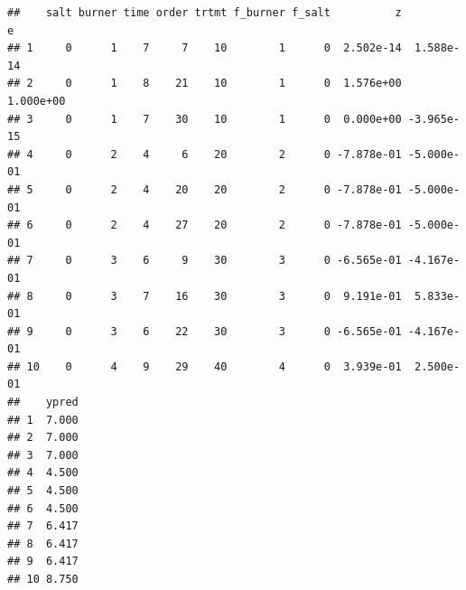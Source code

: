 \documentclass[12pt,]{article}
\newenvironment{Shaded}{\begin{snugshade}}{\end{snugshade}}
\newcommand{\KeywordTok}[1]{\textcolor[rgb]{0.13,0.29,0.53}{\textbf{#1}}}
\newcommand{\DataTypeTok}[1]{\textcolor[rgb]{0.13,0.29,0.53}{#1}}
\newcommand{\DecValTok}[1]{\textcolor[rgb]{0.00,0.00,0.81}{#1}}
\newcommand{\StringTok}[1]{\textcolor[rgb]{0.31,0.60,0.02}{#1}}
\newcommand{\CommentTok}[1]{\textcolor[rgb]{0.56,0.35,0.01}{\textit{#1}}}
\newcommand{\OperatorTok}[1]{\textcolor[rgb]{0.81,0.36,0.00}{\textbf{#1}}}
\newcommand{\NormalTok}[1]{#1}
\begin{document}
\begin{verbatim}
##    salt burner time order trtmt f_burner f_salt          z          e
## 1     0      1    7     7    10        1      0  2.502e-14  1.588e-14
## 2     0      1    8    21    10        1      0  1.576e+00  1.000e+00
## 3     0      1    7    30    10        1      0  0.000e+00 -3.965e-15
## 4     0      2    4     6    20        2      0 -7.878e-01 -5.000e-01
## 5     0      2    4    20    20        2      0 -7.878e-01 -5.000e-01
## 6     0      2    4    27    20        2      0 -7.878e-01 -5.000e-01
## 7     0      3    6     9    30        3      0 -6.565e-01 -4.167e-01
## 8     0      3    7    16    30        3      0  9.191e-01  5.833e-01
## 9     0      3    6    22    30        3      0 -6.565e-01 -4.167e-01
## 10    0      4    9    29    40        4      0  3.939e-01  2.500e-01
##    ypred
## 1  7.000
## 2  7.000
## 3  7.000
## 4  4.500
## 5  4.500
## 6  4.500
## 7  6.417
## 8  6.417
## 9  6.417
## 10 8.750
\end{verbatim}

\begin{Shaded}
\end{Shaded}
\end{document}
